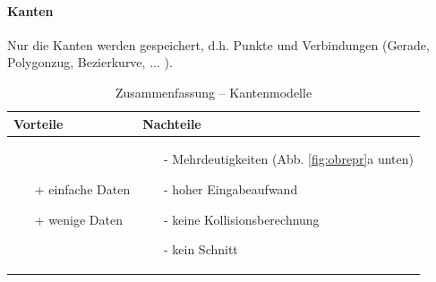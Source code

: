 \paragraph*{Kanten}
Nur die Kanten werden gespeichert, d.h. Punkte und Verbindungen (Gerade, Polygonzug, Bezierkurve, ... ).
\begin{table}[hbt]
\centering
\begin{tabular}{|p{6.5cm}|p{6.5cm}|}
\hline
Vorteile & Nachteile\\
\hline
\vspace{-5mm}
\begin{itemize}
\setlength\itemsep{0em}
\item[+] einfache Daten
\item[+] wenige Daten
\end{itemize}
 &
 \vspace{-5mm}
\begin{itemize}
\setlength\itemsep{0em}
\item[-] Mehrdeutigkeiten (Abb. \ref{fig:obrepr}a unten)
\item[-] hoher Eingabeaufwand
\item[-] keine Kollisionsberechnung
\item[-] kein Schnitt
\end{itemize}\\
\hline
\end{tabular}
\caption{Zusammenfassung -- Kantenmodelle}
\label{tab:Kantenmod}
\end{table}\\ 
